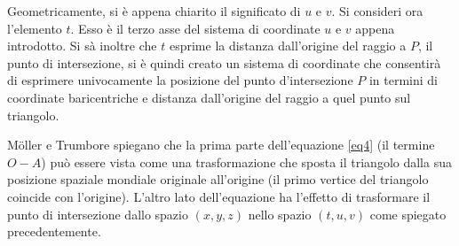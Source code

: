 Geometricamente, si è appena chiarito il significato di $u$ e $v$. Si consideri ora l'elemento $t$. Esso è il terzo asse del sistema di coordinate $u$ e $v$ appena introdotto. Si sà inoltre che $t$ esprime la distanza dall'origine del raggio a $P$, il punto di intersezione, si è quindi creato un sistema di coordinate che consentirà di esprimere univocamente la posizione del punto d'intersezione $P$ in termini di coordinate baricentriche e distanza dall'origine del raggio a quel punto sul triangolo.

M\"oller e Trumbore spiegano che la prima parte dell'equazione \ref{eq4} (il termine $O-A$) può essere vista come una trasformazione che sposta il triangolo dalla sua posizione spaziale mondiale originale all'origine (il primo vertice del triangolo coincide con l'origine). L'altro lato dell'equazione ha l'effetto di trasformare il punto di intersezione dallo spazio $(x,y,z)$ nello spazio $(t,u,v)$ come spiegato precedentemente.

